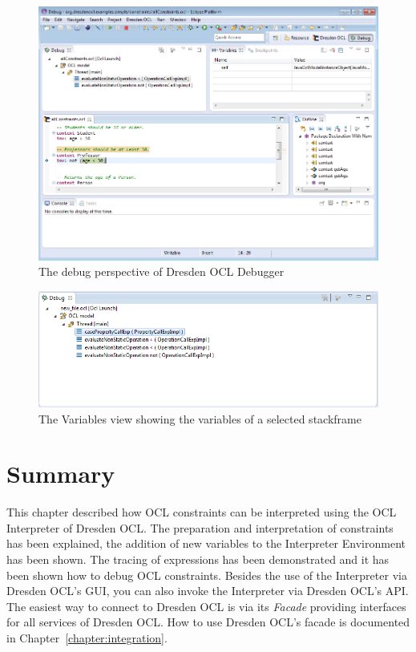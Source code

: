 \begin{figure}[tbp]
	\centering
	\includegraphics[width=\textwidth,height=\textheight,keepaspectratio]{figures/interpreter/debug05}
  \caption{The debug perspective of Dresden OCL Debugger}
  \label{pic:interpreter:debug05}
\end{figure}

\begin{figure}[tbp]
	\centering
	\includegraphics[width=\textwidth,height=\textheight,keepaspectratio]{figures/interpreter/debug06}
  \caption{The Variables view showing the variables of a selected stackframe}
  \label{pic:interpret:debug06}
\end{figure}

\section{Summary}
  
This chapter described how \acs{OCL} constraints can be interpreted using the 
\acs{OCL} Interpreter of Dresden OCL. The preparation and interpretation of 
constraints has been explained, the addition of new variables to the 
Interpreter Environment has been shown. The tracing of expressions has been
demonstrated and it has been shown how to debug \acs{OCL} constraints. Besides
the use of the Interpreter via Dresden OCL's GUI, you can also invoke the Interpreter via Dresden OCL's 
\acs{API}. The easiest way to connect to Dresden OCL is via its \emph{Facade} 
providing interfaces for all services of Dresden OCL. How to use Dresden OCL's 
facade is documented in Chapter~\ref{chapter:integration}.